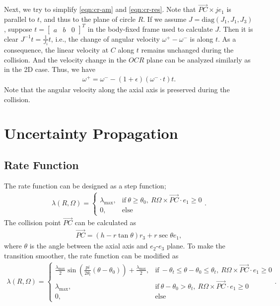 \documentclass[10pt]{article}
\newcommand{\diag}{\ensuremath{\mathrm{diag}}}
\begin{document}
Next, we try to simplify \eqref{eqn:cr-am} and \eqref{eqn:cr-res}.
Note that $\vec{PC} \times je_1$ is parallel to $t$, and thus to the plane of circle $R$.
If we assume $J = \diag(J_1,J_1,J_3)$, suppose $t = \begin{bmatrix} a & b & 0 \end{bmatrix}^T$ in the body-fixed frame used to calculate $J$.
Then it is clear $J^{-1} t = \frac{1}{J_1} t$, i.e., the change of angular velocity $\omega^+ - \omega^-$ is along $t$.
As a consequence, the linear velocity at $C$ along $t$ remains unchanged during the collision.
And the velocity change in the $OCR$ plane can be analyzed similarly as in the 2D case.
Thus, we have
\begin{align} \label{eqn:col_resp}
	\omega^+ = \omega^- - (1+\epsilon) (\omega^- \cdot t) t.
\end{align}
Note that the angular velocity along the axial axis is preserved during the collision.

\section{Uncertainty Propagation}

\subsection{Rate Function}
The rate function can be designed as a step function;
\begin{align}
	\lambda(R,\Omega) = \begin{cases}
		\lambda_{\text{max}}, &\text{if} \ \theta \geq \theta_0, \ R\Omega \times \vec{PC} \cdot e_1 \geq 0 \\
		0, &\text{else}
	\end{cases}.
\end{align}
The collision point $\vec{PC}$ can be calculated as
\begin{align}
	\vec{PC} = (h-r\tan\theta) r_3 + r\sec\theta e_1,
\end{align}
where $\theta$ is the angle between the axial axis and $e_2$-$e_3$ plane.
To make the transition smoother, the rate function can be modified as
\begin{align}
	\lambda(R,\Omega) = \begin{cases}
		\frac{\lambda_{\text{max}}}{2} \sin\left( \frac{pi}{2\theta_t}(\theta-\theta_0) \right) + \frac{\lambda_{\text{max}}}{2}, & \text{if} \ -\theta_t \leq \theta - \theta_0 \leq \theta_t, \ R\Omega \times \vec{PC} \cdot e_1 \geq 0 \\
		\lambda_{\text{max}}, & \text{if} \ \theta - \theta_0 > \theta_t, \ R\Omega \times \vec{PC} \cdot e_1 \geq 0 \\
		0, & \text{else}
	\end{cases}.
\end{align}
\end{document}
